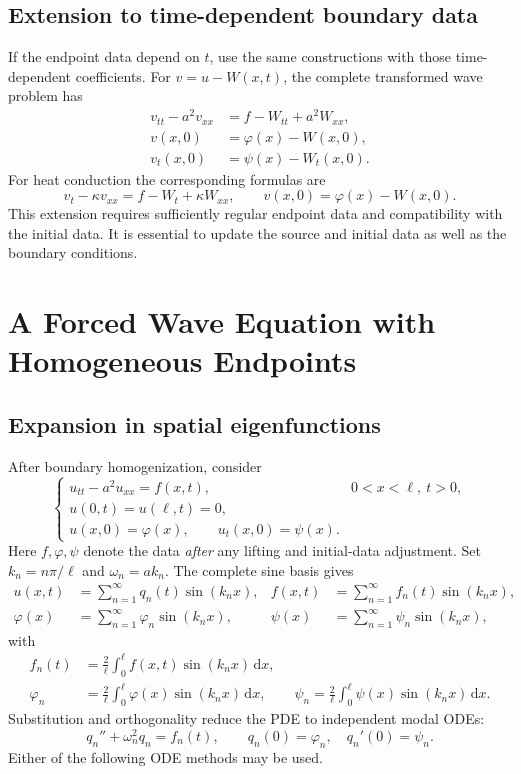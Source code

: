 \documentclass[11pt,a4paper]{article}
\newcommand{\dd}{\,\mathrm{d}}
\begin{document}
\subsection{Extension to time-dependent boundary data}
If the endpoint data depend on $t$, use the same constructions with those
time-dependent coefficients. For $v=u-W(x,t)$, the complete transformed wave
problem has
\begin{align}
 v_{tt}-a^2v_{xx}&=f-W_{tt}+a^2W_{xx},\\
 v(x,0)&=\varphi(x)-W(x,0),\\
 v_t(x,0)&=\psi(x)-W_t(x,0).
\end{align}
For heat conduction the corresponding formulas are
\begin{equation}
 v_t-\kappa v_{xx}=f-W_t+\kappa W_{xx},\qquad
 v(x,0)=\varphi(x)-W(x,0).
\end{equation}
This extension requires sufficiently regular endpoint data and compatibility
with the initial data. It is essential to update the source and initial data
as well as the boundary conditions.

\section{A Forced Wave Equation with Homogeneous Endpoints}
\subsection{Expansion in spatial eigenfunctions}
After boundary homogenization, consider
\begin{equation}\label{eq:forcedproblem}
 \begin{cases}
 u_{tt}-a^2u_{xx}=f(x,t),&0<x<\ell,\ t>0,\\
 u(0,t)=u(\ell,t)=0,\\
 u(x,0)=\varphi(x),\qquad u_t(x,0)=\psi(x).
 \end{cases}
\end{equation}
Here $f,\varphi,\psi$ denote the data \emph{after} any lifting and initial-data
adjustment. Set $k_n=n\pi/\ell$ and $\omega_n=ak_n$. The complete sine basis gives
\begin{align}
 u(x,t)&=\sum_{n=1}^\infty q_n(t)\sin(k_nx),&
 f(x,t)&=\sum_{n=1}^\infty f_n(t)\sin(k_nx),\\
 \varphi(x)&=\sum_{n=1}^\infty\varphi_n\sin(k_nx),&
 \psi(x)&=\sum_{n=1}^\infty\psi_n\sin(k_nx),
\end{align}
with
\begin{align}
 f_n(t)&=\frac2\ell\int_0^\ell f(x,t)\sin(k_nx)\dd x,\\
 \varphi_n&=\frac2\ell\int_0^\ell\varphi(x)\sin(k_nx)\dd x,\qquad
 \psi_n=\frac2\ell\int_0^\ell\psi(x)\sin(k_nx)\dd x.
\end{align}
Substitution and orthogonality reduce the PDE to independent modal ODEs:
\begin{equation}\label{eq:modalode}
 \boxed{q_n''+\omega_n^2q_n=f_n(t),\qquad
                 q_n(0)=\varphi_n,\quad q_n'(0)=\psi_n.}
\end{equation}
Either of the following ODE methods may be used.
\end{document}
